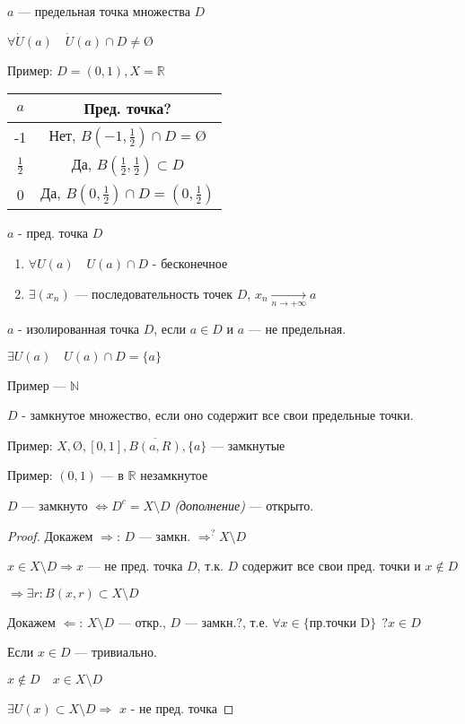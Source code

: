 \begin{definition}
    $a$ --- предельная точка множества $D$
    
    $\forall \dot U(a) \quad \dot U(a)\cap D\not = \text{\O}$
\end{definition}

Пример: $D=(0,1), X=\mathbb{R}$

\begin{tabular}{c|c}
    $a$&Пред. точка? \\
    \hline
    -1& Нет, $B(-1, \frac{1}{2})\cap D=\text{\O}$\\
    \hline
    $\frac{1}{2}$ & Да, $B(\frac{1}{2}, \frac{1}{2})\subset D$\\
    \hline
    0 & Да, $B(0,\frac{1}{2})\cap D = (0, \frac{1}{2})$
\end{tabular}

\begin{remark}
    $a$ - пред. точка $D$
    \begin{enumerate}
        \item $\forall U(a) \quad U(a)\cap D$ - бесконечное
        \item $\exists (x_n)$ --- последовательность точек $D$, $x_n\underset{n\to +\infty}\to a$
    \end{enumerate}
\end{remark}

\begin{definition}
    $a$ - изолированная точка $D$, если $a\in D$ и $a$ --- не предельная.

    $\exists U(a) \quad U(a)\cap D = \{a\}$
\end{definition}

Пример --- $\mathbb{N}$

\begin{definition}
    $D$ - замкнутое множество, если оно содержит все свои предельные точки.
\end{definition}

Пример: $X, \text{\O}, [0,1], \overline{B(a,R)}, \{a\}$ --- замкнутые

Пример: $(0, 1)$ --- в $\mathbb{R}$ незамкнутое

\begin{theorem}
    $D$ --- замкнуто $\Leftrightarrow D^c=X\setminus D$ \textit{(дополнение)} --- открыто.
\end{theorem}

\begin{proof}
    Докажем $\Rightarrow$: $D$ --- замкн. $\Rightarrow^? X\setminus D$

    $x\in X\setminus D \Rightarrow x$ --- не пред. точка $D$, т.к. $D$ содержит все свои пред. точки и $x\not\in D$ 
    
    $\Rightarrow\exists r : B(x,r)\subset X\setminus D$

    Докажем $\Leftarrow$: $X\setminus D$ --- откр., $D$ --- замкн.?, т.е. $\forall x\in\{\text{пр.точки D}\} \ \ ?x\in D$

    Если $x\in D$ --- тривиально.

    $x\not\in D\quad x\in X\setminus D$

    $\exists U(x)\subset X\setminus D \Rightarrow$ $x$ - не пред. точка
\end{proof}

